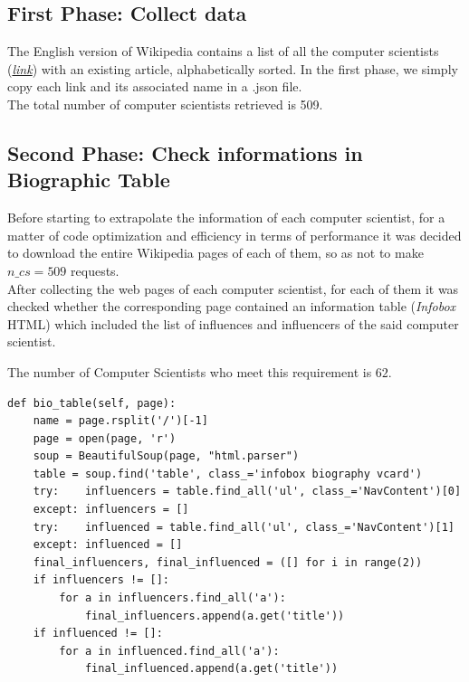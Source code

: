\documentclass[12pt, twoside]{article}
\begin{document}
\subsection{First Phase: Collect data}
The English version of Wikipedia contains a list of all the computer scientists (\textit{\href{https://en.wikipedia.org/wiki/List_of_computer_scientists}{link}}) with an existing article, alphabetically sorted. In the first phase, we simply copy each link and its associated name in a .json file.\\
The total number of computer scientists retrieved is 509.

\subsection{Second Phase: Check informations in  Biographic Table}
Before starting to extrapolate the information of each computer scientist, for a matter of code optimization and efficiency in terms of performance it was decided to download the entire Wikipedia pages of each of them, so as not to make $ n\_cs =  509$ requests. \\
After collecting the web pages of each computer scientist, for each of them it was checked whether the corresponding page contained an information table (\textit{Infobox} HTML) which included the list of influences and influencers of the said computer scientist.

The number of Computer Scientists who meet this requirement is $ 62 $.
\begin{lstlisting}[language = iPython, caption={Checking Bio Table Function},captionpos=b]
def bio_table(self, page):
    name = page.rsplit('/')[-1]
    page = open(page, 'r')
    soup = BeautifulSoup(page, "html.parser")
    table = soup.find('table', class_='infobox biography vcard')
    try:	influencers = table.find_all('ul', class_='NavContent')[0]
    except:	influencers = []
    try:	influenced = table.find_all('ul', class_='NavContent')[1]
    except:	influenced = []
    final_influencers, final_influenced = ([] for i in range(2))
    if influencers != []:
        for a in influencers.find_all('a'):
        	final_influencers.append(a.get('title'))
    if influenced != []:
        for a in influenced.find_all('a'):
        	final_influenced.append(a.get('title'))
\end{lstlisting}
\end{document}
